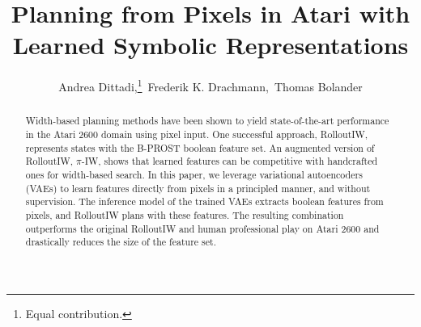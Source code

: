 \documentclass[letterpaper]{article} %
\title{Planning from Pixels in Atari with Learned Symbolic Representations}
\author {
        Andrea Dittadi,\thanks{Equal contribution.}\ 
        Frederik K. Drachmann,\samethanks\ 
        Thomas Bolander
        \\
}
\begin{document}

\maketitle

\begin{abstract}
Width-based planning methods have been shown to yield state-of-the-art performance in the Atari 2600 domain using pixel input. One successful approach, RolloutIW, represents states with the B-PROST boolean feature set. An augmented version of RolloutIW, $\pi$-IW, shows that learned features can be competitive with handcrafted ones for width-based search. 
In this paper, we leverage variational autoencoders (VAEs) to learn features directly from pixels in a principled manner, and without supervision. 
The inference model of the trained VAEs extracts boolean features from pixels, and RolloutIW plans with these features. The resulting combination outperforms the original RolloutIW and human professional play on Atari 2600 and drastically reduces the size of the feature set.
\end{abstract}















\clearpage

\appendix


\end{document}
